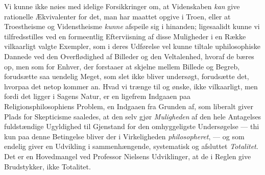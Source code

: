 \documentclass[12pt,a4paper]{book}
\newcommand{\opage}[1]{\marginnote{\footnotesize\textit{[#1]}}}
\begin{document}
Vi kunne ikke nøies med idelige Forsikkringer om,
at Videnskaben \emph{kan} give rationelle Ækvivalenter for
det, man har maattet opgive i Troen, eller at Troestheisme og Videnstheisme \emph{kunne} afspeile sig i hinanden; ligesaalidt kunne vi tilfredsstilles ved en formeentlig Efterviisning af disse Muligheder i en Række
vilkaarligt valgte Exempler, som i deres Udførelse vel
kunne tiltale uphilosophiske Dannede ved den Overflødighed af Billeder og den Veltalenhed, hvoraf de bæres
op, men som for Enhver, der forstaaer at skjelne mellem
Billede og Begreb, forudsætte saa uendelig Meget, som
slet ikke bliver undersøgt, forudsætte det, hvorpaa det
netop kommer an. Hvad vi trænge til og ønske, ikke
vilkaarligt, men fordi det ligger i Sagens Natur, er en
ligefrem Indgaaen paa Religionsphilosophiens Problem,
en Indgaaen fra Grunden af, som liberalt giver Plads
for Skepticisme saaledes, at den selv gjør \emph{Muligheden} af den hele Antagelses fuldstændige Ugyldighed
\opage{93}\setcounter{footnote}{0}%
til Gjenstand for den omhyggeligste Undersøgelse --- thi
kun paa denne Betingelse bliver der i Virkeligheden
\emph{philosopheret}, --- og som endelig giver en Udvikling
i sammenhængende, systematisk og afsluttet \emph{Totalitet}.
Det er en Hovedmangel ved Professor Nielsens Udviklinger, at de i Reglen give Brudstykker, ikke Totalitet.
\end{document}
